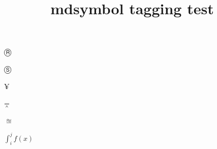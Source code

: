 \documentclass{article}
\title{mdsymbol tagging test}
\def\circledR{Ⓡ}
\def\circledS{Ⓢ}
\def\yen{¥}
\begin{document}
\circledR

\circledS

\yen

\dagger

\ddagger

\mathparagraph

\mathsection

\mathdollar

\mathsterling

$\doublebarwedge$

$\approxeq$

$\int_i^j f(x)$
\end{document}
